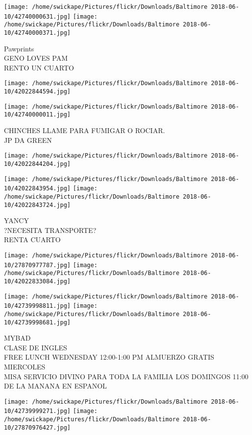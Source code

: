 \documentclass[10pt,letterpaper]{article}
\begin{document}
\vspace{0.25in}
\texttt{[image: /home/swickape/Pictures/flickr/Downloads/Baltimore 2018-06-10/42740000631.jpg]}
\texttt{[image: /home/swickape/Pictures/flickr/Downloads/Baltimore 2018-06-10/42740000371.jpg]}

Pawprints\\
GENO LOVES PAM\\
RENTO UN CUARTO
\pagebreak

\texttt{[image: /home/swickape/Pictures/flickr/Downloads/Baltimore 2018-06-10/42022844594.jpg]}

\vspace{0.25in}
\texttt{[image: /home/swickape/Pictures/flickr/Downloads/Baltimore 2018-06-10/42740000011.jpg]}

CHINCHES LLAME PARA FUMIGAR O ROCIAR.\\
JP DA GREEN
\pagebreak

\texttt{[image: /home/swickape/Pictures/flickr/Downloads/Baltimore 2018-06-10/42022844204.jpg]}

\vspace{0.25in}
\texttt{[image: /home/swickape/Pictures/flickr/Downloads/Baltimore 2018-06-10/42022843954.jpg]}
\texttt{[image: /home/swickape/Pictures/flickr/Downloads/Baltimore 2018-06-10/42022843724.jpg]}

YANCY\\
?NECESITA TRANSPORTE?\\
RENTA CUARTO
\pagebreak

\texttt{[image: /home/swickape/Pictures/flickr/Downloads/Baltimore 2018-06-10/27870977787.jpg]}
\texttt{[image: /home/swickape/Pictures/flickr/Downloads/Baltimore 2018-06-10/42022833084.jpg]}

\texttt{[image: /home/swickape/Pictures/flickr/Downloads/Baltimore 2018-06-10/42739998811.jpg]}
\texttt{[image: /home/swickape/Pictures/flickr/Downloads/Baltimore 2018-06-10/42739998681.jpg]}

MYBAD\\
CLASE DE INGLES\\
FREE LUNCH WEDNESDAY 12:00{-}1:00 PM ALMUERZO GRATIS MIERCOLES\\
MISA SERVICIO DIVINO PARA TODA LA FAMILIA LOS DOMINGOS 11:00 DE LA MANANA EN ESPANOL
\pagebreak

\texttt{[image: /home/swickape/Pictures/flickr/Downloads/Baltimore 2018-06-10/42739999271.jpg]}
\texttt{[image: /home/swickape/Pictures/flickr/Downloads/Baltimore 2018-06-10/27870976427.jpg]}
\end{document}
